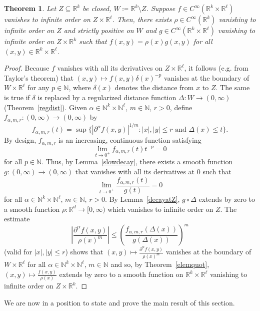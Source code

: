 \documentclass[12pt]{article}
\theoremstyle{plain}
\newtheorem{thm}{Theorem}[section]
\theoremstyle{definition}
\newcommand{\R}{\mathbb{R}}
\newcommand{\N}{\mathbb{N}}
\numberwithin{equation}{section}
\begin{document}
 


\begin{thm}\label{localfac}
Let $Z \subseteq \R^k$ be closed, $W \coloneqq \R^k \setminus Z$. Suppose $f \in C^\infty(\R^k \times \R^\ell)$ vanishes to infinite order on $Z \times \R^\ell$. Then, there exists $\rho \in C^\infty(\R^k)$ vanishing to infinite order on $Z$ and strictly positive on $W$ and $g \in C^\infty(\R^k \times \R^\ell)$ vanishing to infinite order on $Z \times \R^k$ such that $f(x,y) = \rho(x) g(x,y)$ for all $(x,y) \in \R^k\times \R^\ell$. 
\end{thm}

\begin{proof}
Because $f$ vanishes with all its derivatives on $Z \times \R^\ell$, it follows (e.g. from Taylor's theorem) that  $(x,y)\mapsto f(x,y)\delta(x)^{-p}$ vanishes at the boundary of $W\times\R^\ell$  for any $p \in \N$, where $\delta(x)$ denotes the distance from $x$ to $Z$. The same is true if $\delta$ is replaced by a regularized distance function $\Delta : W \to (0,\infty)$ (Theorem~\ref{regdist}). Given $\alpha \in \N^k \times \N^\ell$, $m \in \N$, $r>0$, define $f_{\alpha,m,r} : (0,\infty)\to(0,\infty)$ by
\[ f_{\alpha,m,r}(t) = \sup \{ |\partial^\alpha f(x,y)|^{1/m}  : |x|,|y| \leq r \text{ and }
\Delta(x) \leq t \}. \]
By design, $f_{\alpha,m,r}$ is an increasing, continuous function satisfying 
\[ \lim_{t\to0^+} f_{\alpha,m,r}(t) t^{-p} = 0 \]
for all $p \in \N$. Thus, by Lemma~\ref{slowdecay}, there exists a smooth function $g : (0,\infty)\to(0,\infty)$ that vanishes with all its derivatives at $0$ such that 
\[ \lim_{t\to0^+} \frac{f_{\alpha,m,r}(t)}{g(t)} =0 \]
for all $\alpha \in \N^k\times\N^\ell$, $m\in\N$, $r>0$. By Lemma~\ref{decayatZ}, $g \circ \Delta$ extends by zero to a smooth function $\rho : \R^d \to [0,\infty)$ which vanishes to infinite order on $Z$. The estimate 
\[ \left| \frac{ \partial^\alpha f (x,y)}{\rho(x)^m} \right| \leq
\left( \frac{f_{\alpha, m,r}(\Delta(x))}{g(\Delta(x))} \right)^m \]
(valid for $|x|,|y| \leq r$) shows that $(x,y) \mapsto \frac{\partial^\alpha f(x,y)}{\rho(x)^m}$  vanishes at the boundary of $W \times \R^\ell$ for all $\alpha \in \N^k\times\N^\ell$, $m\in\N$ and so, by Theorem~\ref{elemquot}, $(x,y) \mapsto \frac{f(x,y)}{\rho(x)}$ extends by zero to a smooth function on $\R^k\times\R^\ell$ vanishing to infinite order on $Z \times \R^k$. 
\end{proof}



We are now in a position to state and prove the main result of this section.
\end{document}
